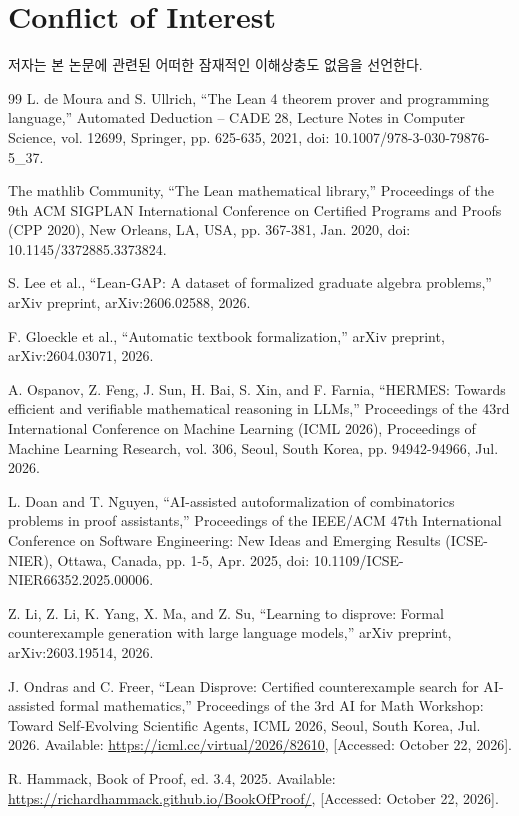 \documentclass[a4paper,9pt,twocolumn]{extarticle}
\begin{document}
\section*{Conflict of Interest}
저자는 본 논문에 관련된 어떠한 잠재적인 이해상충도 없음을 선언한다.
\begingroup\small
\begin{thebibliography}{99}
 L. de Moura and S. Ullrich, “The Lean 4 theorem prover and programming language,” Automated Deduction – CADE 28, Lecture Notes in Computer Science, vol. 12699, Springer, pp. 625-635, 2021, doi: 10.1007/978-3-030-79876-5\_37.

 The mathlib Community, “The Lean mathematical library,” Proceedings of the 9th ACM SIGPLAN International Conference on Certified Programs and Proofs (CPP 2020), New Orleans, LA, USA, pp. 367-381, Jan. 2020, doi: 10.1145/3372885.3373824.

 S. Lee et al., “Lean-GAP: A dataset of formalized graduate algebra problems,” arXiv preprint, arXiv:2606.02588, 2026.

 F. Gloeckle et al., “Automatic textbook formalization,” arXiv preprint, arXiv:2604.03071, 2026.

 A. Ospanov, Z. Feng, J. Sun, H. Bai, S. Xin, and F. Farnia, “HERMES: Towards efficient and verifiable mathematical reasoning in LLMs,” Proceedings of the 43rd International Conference on Machine Learning (ICML 2026), Proceedings of Machine Learning Research, vol. 306, Seoul, South Korea, pp. 94942-94966, Jul. 2026.

 L. Doan and T. Nguyen, “AI-assisted autoformalization of combinatorics problems in proof assistants,” Proceedings of the IEEE/ACM 47th International Conference on Software Engineering: New Ideas and Emerging Results (ICSE-NIER), Ottawa, Canada, pp. 1-5, Apr. 2025, doi: 10.1109/ICSE-NIER66352.2025.00006.

 Z. Li, Z. Li, K. Yang, X. Ma, and Z. Su, “Learning to disprove: Formal counterexample generation with large language models,” arXiv preprint, arXiv:2603.19514, 2026.

 J. Ondras and C. Freer, “Lean Disprove: Certified counterexample search for AI-assisted formal mathematics,” Proceedings of the 3rd AI for Math Workshop: Toward Self-Evolving Scientific Agents, ICML 2026, Seoul, South Korea, Jul. 2026. Available: \url{https://icml.cc/virtual/2026/82610}, [Accessed: October 22, 2026].

 R. Hammack, Book of Proof, ed. 3.4, 2025. Available: \url{https://richardhammack.github.io/BookOfProof/}, [Accessed: October 22, 2026].


\end{thebibliography}
\end{document}
